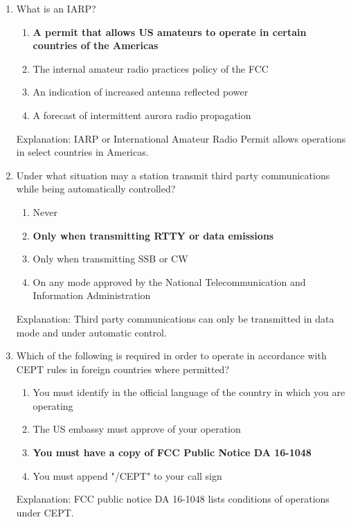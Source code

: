 \begin{enumerate}
        \item What is an IARP?
       \begin{enumerate}
        \item \textbf {A permit that allows US amateurs to operate in certain countries of the Americas}
         \item  The internal amateur radio practices policy of the FCC
        \item  An indication of increased antenna reflected power
       \item  A forecast of intermittent aurora radio propagation
        \end{enumerate}
        \textcolor{myred}{Explanation:}
      IARP or International Amateur Radio Permit allows operations in select countries in Americas.

    \item Under what situation may a station transmit third party communications while being automatically controlled?
        \begin{enumerate}
        \item Never
          \item \textbf {Only when transmitting RTTY or data emissions}
         \item  Only when transmitting SSB or CW
        \item  On any mode approved by the National Telecommunication and Information Administration
     \end{enumerate}
       \textcolor{myred}{Explanation:}
        Third party communications can only be transmitted in data mode and under automatic control.

    \item Which of the following is required in order to operate in accordance with CEPT rules in foreign countries where permitted?
       \begin{enumerate}
         \item You must identify in the official language of the country in which you are operating
    \item  The US embassy must approve of your operation
    \item \textbf {You must have a copy of FCC Public Notice DA 16-1048}
        \item  You must append "/CEPT" to your call sign
    \end{enumerate}
        \textcolor{myred}{Explanation:}
     FCC public notice DA 16-1048 lists conditions of operations under CEPT.


\end{enumerate}
